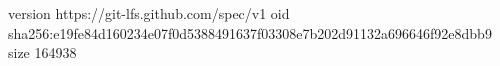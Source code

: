 version https://git-lfs.github.com/spec/v1
oid sha256:e19fe84d160234e07f0d5388491637f03308e7b202d91132a696646f92e8dbb9
size 164938
